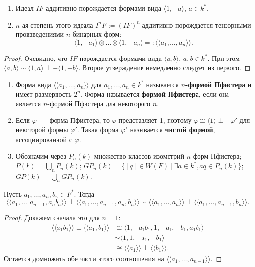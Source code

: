 \documentclass[a4paper,oneside,12pt]{article}
\theoremstyle{plain} { \swapnumbers
\newtheorem{theorem}{Теорема}[subsection]
\newtheorem{corollary}[theorem]{Следствие}
\newtheorem{lemma}[theorem]{Лемма}
\newtheorem{proposition}[theorem]{Утверждение}
\newtheorem{claim}[theorem]{Факт}
}
\theoremstyle{definition} { \swapnumbers
\newtheorem{definition}[theorem]{Определение}
\newtheorem{notation}[theorem]{Обозначение}
\newtheorem{remark}[theorem]{Замечание}
\newtheorem{remarks}[theorem]{Замечания}
\newtheorem{example}[theorem]{Пример}
\newtheorem{examples}[theorem]{Примеры}
\newtheorem{sssection}[theorem]{}
}
\def\ph{\varphi}
\def\la{\langle}
\def\ra{\rangle}
\def\lla{\la\!\la}
\def\rra{\ra\!\ra}
\begin{document}

\begin{lemma}
\begin{enumerate}
\item Идеал $IF$ аддитивно порождается формами вида $\la 1,-a\ra$, $a\in k^*$.
\item $n$-ая степень этого идеала $I^nF:=(IF)^n$ аддитивно порождается тензорными произведениями
$n$ бинарных форм:
$$
\la 1,-a_1\ra\otimes\dots\otimes\la 1,-a_n\ra=:\lla a_1,\dots,a_n\rra.
$$
\end{enumerate}
\end{lemma}
\begin{proof}
Очевидно, что $IF$ порождается формами вида $\la a,b\ra$, $a,b\in k^*$. При этом
$\la a,b\ra\sim\la 1,a\ra\perp -\la 1,-b\ra$. Второе утверждение немедленно следует из первого.
\end{proof}


\begin{definition}
\begin{enumerate}
\item Форма вида $\lla a_1,\dots,a_n\rra$ для $a_1,\dots,a_n\in k^*$
называется {\bf $n$-формой Пфистера} и имеет размерность $2^n$.
Форма называется {\bf формой Пфистера}, если она является $n$-формой Пфистера для некоторого $n$.
\item Если $\ph$~--- форма Пфистера, то $\ph$ представляет 1, поэтому $\ph\cong\la 1\ra\perp-\ph'$
для некоторой формы $\ph'$. Такая форма $\ph'$ называется {\bf чистой формой}, ассоциированной с $\ph$.
\item Обозначим через $P_n(k)$ множество классов изометрий $n$-форм Пфистера; $P(k)=\bigcup_nP_n(k)$;
$GP_n(k)=\{[q]\in W(F)\mid\exists a\in k^*, aq\in P_n(k)\}$; $GP(k)=\bigcup_nGP_n(k)$.
\end{enumerate}
\end{definition}

\begin{lemma}\label{lemma:pfister_identity}
Пусть $a_1,\dots,a_n,b_n\in F^*$. Тогда
$$
\lla a_1,\dots,a_{n-1},a_nb_n\rra\perp\lla a_1,\dots,a_{n-1},a_n,b_n\rra\sim\lla a_1,\dots,a_n\rra\perp\lla a_1,\dots,a_{n-1},b_n\rra.
$$
\end{lemma}
\begin{proof}
Докажем сначала это для $n=1$:
$$
\begin{aligned}
\lla a_1b_1\rra\perp\lla a_1,b_1\rra&\cong\la 1,-a_1b_1,1,-a_1,-b_1,a_1b_1\ra\\
&\sim\la 1,1,-a_1,-b_1\ra\\
&\cong\lla a_1\rra\perp\lla b_1\rra.
\end{aligned}
$$
Остается домножить обе части этого соотношения на $\lla a_1,\dots,a_{n-1}\rra$.
\end{proof}
\end{document}
